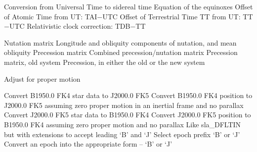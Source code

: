 \begin{callset}
   Conversion from Universal Time to sidereal time
   Equation of the equinoxes
   Offset of Atomic Time from UT: TAI$-$UTC
   Offset of Terrestrial Time TT from UT: TT$-$UTC
   Relativistic clock correction: TDB$-$TT
\end{callset}

\begin{callset}
   Nutation matrix
   Longitude and obliquity components of nutation, and
     mean obliquity
   Precession matrix
   Combined precession/nutation matrix
   Precession matrix, old system
   Precession, in either the old or the new system
\end{callset}

\begin{callset}
   Adjust for proper motion
\end{callset}

\begin{callset}
   Convert B1950.0 FK4 star data to J2000.0 FK5
   Convert B1950.0 FK4 position to J2000.0 FK5 assuming zero
     proper motion in an inertial frame and no parallax
   Convert J2000.0 FK5 star data to B1950.0 FK4
   Convert J2000.0 FK5 position to B1950.0 FK4 assuming zero
     proper motion and no parallax
   Like sla\_DFLTIN but with extensions to accept leading `B' and `J'
   Select epoch prefix `B' or `J'
   Convert an epoch into the appropriate form -- `B' or `J'
\end{callset}


